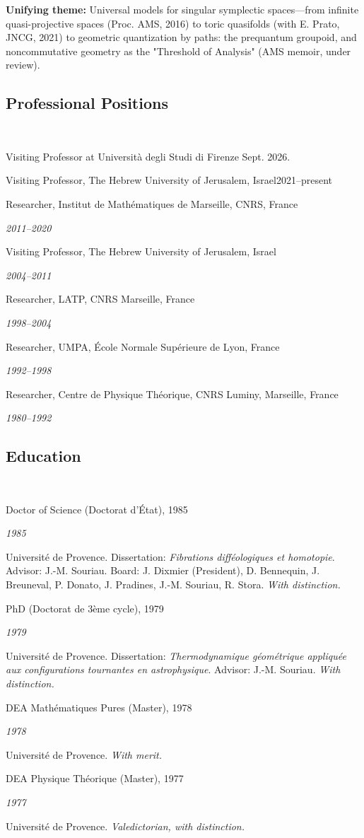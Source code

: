 \documentclass[11pt,reqno]{amsart}
\newlength{\datewidth}
\newcommand{\dateditem}[2]{\noindent\hangindent=0.5cm #1 \hfill \parbox[t]{\datewidth}{\raggedleft\itshape #2}\vspace{.2ex}\par}
\begin{document}
  \textbf{Unifying theme:} Universal models for singular symplectic spaces—from infinite quasi-projective spaces (Proc. AMS, 2016) to toric quasifolds (with E. Prato, JNCG, 2021) to geometric quantization by paths: the prequantum groupoid, and noncommutative geometry as the "Threshold of Analysis" (AMS memoir, under review).
  
  \subsection*{Professional Positions} \null\
  
  \dateditem{Visiting Professor at Università degli Studi di Firenze Sept. 2026.}
  
  \dateditem{Visiting Professor, The Hebrew University of Jerusalem, Israel}{2021–present}
  
  \dateditem{Researcher, Institut de Mathématiques de Marseille, CNRS, France}{2011–2020}
  
  \dateditem{Visiting Professor, The Hebrew University of Jerusalem, Israel}{2004–2011}
  
  \dateditem{Researcher, LATP, CNRS Marseille, France}{1998–2004}
  
  \dateditem{Researcher, UMPA, École Normale Supérieure de Lyon, France}{1992–1998}
  
  \dateditem{Researcher, Centre de Physique Théorique, CNRS Luminy, Marseille, France}{1980–1992}
  
  \subsection*{Education} \null\
  
  \dateditem{Doctor of Science (Doctorat d'État), 1985}{1985}
  Université de Provence. Dissertation: \emph{Fibrations difféologiques et homotopie}. Advisor: J.-M. Souriau. Board: J. Dixmier (President), D. Bennequin, J. Breuneval, P. Donato, J. Pradines, J.-M. Souriau, R. Stora. \emph{With distinction.}
  
  \dateditem{PhD (Doctorat de 3ème cycle), 1979}{1979}
  Université de Provence. Dissertation: \emph{Thermodynamique géométrique appliquée aux configurations tournantes en astrophysique}. Advisor: J.-M. Souriau. \emph{With distinction.}
  
  \dateditem{DEA Mathématiques Pures (Master), 1978}{1978}
  Université de Provence. \emph{With merit.}
  
  \dateditem{DEA Physique Théorique (Master), 1977}{1977}
  Université de Provence. \emph{Valedictorian, with distinction.}
  
\end{document}
